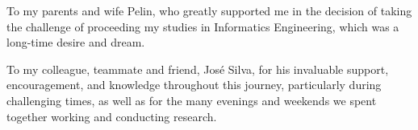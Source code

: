

\frontmatter %

\pagestyle{plain}

\maketitlepage

\integritystatement

\begin{dedicatory}
To my parents and wife Pelin, who greatly supported me in the decision of
taking the challenge of proceeding my studies in Informatics Engineering,
which was a long-time desire and dream.

To my colleague, teammate and friend, Jos\'e Silva, for his invaluable
support, encouragement, and knowledge throughout this journey, particularly
during challenging times, as well as for the many evenings and weekends we
spent together working and conducting research.
\end{dedicatory}

